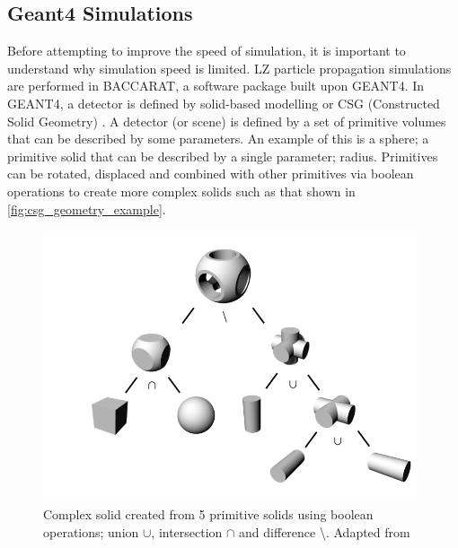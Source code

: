 \subsection{Geant4 Simulations}
\par
Before attempting to improve the speed of simulation, it is important to understand why simulation speed is limited. 
LZ particle propagation simulations are performed in BACCARAT, a software package built upon GEANT4.
In GEANT4, a detector is defined by solid-based modelling or CSG (Constructed Solid Geometry) \cite{geant4_geometry_ref}.
A detector (or scene) is defined by a set of primitive volumes that can be described by some parameters.
An example of this is a sphere; a primitive solid that can be described by a single parameter; radius.
Primitives can be rotated, displaced and combined with other primitives via boolean operations to create more complex solids such as that shown in \autoref{fig:csg_geometry_example}.
\begin{figure}
\includegraphics[height=8cm]{Figures/Simulations/csg_geometry.png}
\centering
\caption{Complex solid created from 5 primitive solids using boolean operations; union $\cup$, intersection $\cap$ and difference \textbackslash. Adapted from \cite{csg_geomtry_ref}}
\label{fig:csg_geometry_example}
\end{figure}

